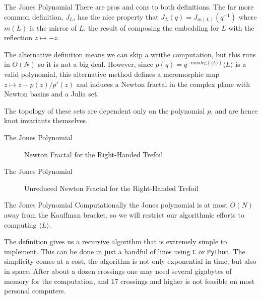 \documentclass{beamer}
\begin{document}
    \begin{frame}{The Jones Polynomial}
        There are pros and cons to both definitions. The far more common
        definition, $J_{L}$, has the nice property that
        $J_{L}(q)=J_{m(L)}(q^{-1})$ where $m(L)$ is the mirror of $L$,
        the result of composing the embedding for $L$ with the
        reflection $z\mapsto{-z}$.
        \par\hfill\par
        The alternative definition means we can skip a writhe computation,
        but this runs in $O(N)$ so it is not a big deal. However, since
        $p(q)=q^{-\textrm{mindeg}(\langle{L}\rangle)}\langle{L}\rangle$ is a
        valid polynomial, this alternative method defines a
        meromorphic map $z\mapsto{z}-p(z)/p'(z)$ and induces a Newton fractal
        in the complex plane with Newton basins and a Julia set.
        \par\hfill\par
        The topology of these
        sets are dependent only on the polynomial $p$, and are hence knot
        invariants themselves.
    \end{frame}
    \begin{frame}{The Jones Polynomial}
        \begin{figure}
            \centering
            \caption{Newton Fractal for the Right-Handed Trefoil}
        \end{figure}
    \end{frame}
    \begin{frame}{The Jones Polynomial}
        \begin{figure}
            \centering
            \caption{Unreduced Newton Fractal for the Right-Handed Trefoil}
        \end{figure}
    \end{frame}
    \begin{frame}{The Jones Polynomial}
        Computationally the Jones polynomial is at most
        $O(N)$ away from the Kauffman bracket, so we will restrict our
        algorithmic efforts to computing $\langle{L}\rangle$.
        \par\hfill\par
        The definition gives us a recursive algorithm that is extremely
        simple to implement. This can be done in just a handful of lines using
        \texttt{C} or \texttt{Python}. The simplicity comes at a cost,
        the algorithm is not only exponential in time, but also in space.
        After about a dozen crossings one may need several gigabytes of
        memory for the computation, and 17 crossings and higher is not
        feasible on most personal computers.
    \end{frame}
\end{document}

